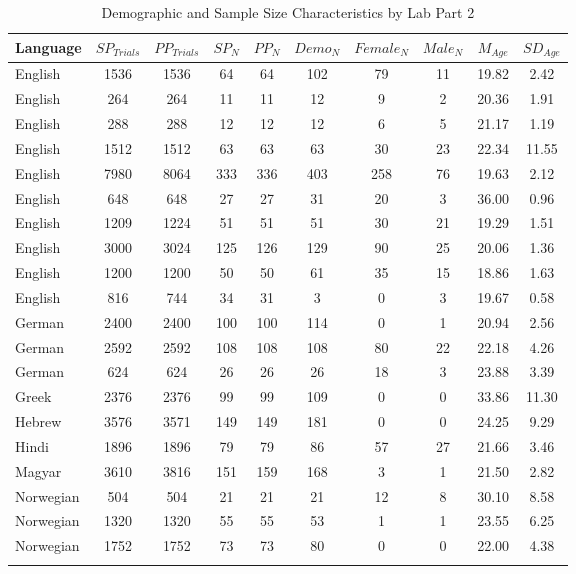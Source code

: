 \documentclass[
  man,mask,floatsintext]{apa7}
\begin{document}
\newpage

\begin{table}[tbp]

\begin{center}
\begin{threeparttable}

\caption{\label{tab:print-part2}Demographic and Sample Size Characteristics by Lab Part 2}

\footnotesize{

\begin{tabular}{lccccccccc}
\toprule
Language & $SP_{Trials}$ & $PP_{Trials}$ & $SP_N$ & $PP_N$ & $Demo_N$ & $Female_N$ & $Male_N$ & $M_{Age}$ & $SD_{Age}$\\
\midrule
English & 1536 & 1536 & 64 & 64 & 102 & 79 & 11 & 19.82 & 2.42\\
English & 264 & 264 & 11 & 11 & 12 & 9 & 2 & 20.36 & 1.91\\
English & 288 & 288 & 12 & 12 & 12 & 6 & 5 & 21.17 & 1.19\\
English & 1512 & 1512 & 63 & 63 & 63 & 30 & 23 & 22.34 & 11.55\\
English & 7980 & 8064 & 333 & 336 & 403 & 258 & 76 & 19.63 & 2.12\\
English & 648 & 648 & 27 & 27 & 31 & 20 & 3 & 36.00 & 0.96\\
English & 1209 & 1224 & 51 & 51 & 51 & 30 & 21 & 19.29 & 1.51\\
English & 3000 & 3024 & 125 & 126 & 129 & 90 & 25 & 20.06 & 1.36\\
English & 1200 & 1200 & 50 & 50 & 61 & 35 & 15 & 18.86 & 1.63\\
English & 816 & 744 & 34 & 31 & 3 & 0 & 3 & 19.67 & 0.58\\
German & 2400 & 2400 & 100 & 100 & 114 & 0 & 1 & 20.94 & 2.56\\
German & 2592 & 2592 & 108 & 108 & 108 & 80 & 22 & 22.18 & 4.26\\
German & 624 & 624 & 26 & 26 & 26 & 18 & 3 & 23.88 & 3.39\\
Greek & 2376 & 2376 & 99 & 99 & 109 & 0 & 0 & 33.86 & 11.30\\
Hebrew & 3576 & 3571 & 149 & 149 & 181 & 0 & 0 & 24.25 & 9.29\\
Hindi & 1896 & 1896 & 79 & 79 & 86 & 57 & 27 & 21.66 & 3.46\\
Magyar & 3610 & 3816 & 151 & 159 & 168 & 3 & 1 & 21.50 & 2.82\\
Norwegian & 504 & 504 & 21 & 21 & 21 & 12 & 8 & 30.10 & 8.58\\
Norwegian & 1320 & 1320 & 55 & 55 & 53 & 1 & 1 & 23.55 & 6.25\\
Norwegian & 1752 & 1752 & 73 & 73 & 80 & 0 & 0 & 22.00 & 4.38\\
\bottomrule
\addlinespace
\end{tabular}

}
\end{threeparttable}
\end{center}
\end{table}
\end{document}
